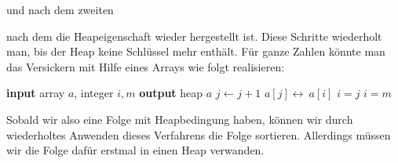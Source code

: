 \documentclass[tikz,12pt]{article}
\begin{document}
und nach dem zweiten
\begin{center}
\end{center}
nach dem die Heapeigenschaft wieder hergestellt ist.
Diese Schritte wiederholt man, bis der Heap keine Schlüssel mehr enthält. 
Für ganze Zahlen könnte man das Versickern mit Hilfe eines Arrays wie folgt realisieren:
\begin{algorithmic}[1]
  \State \textbf{input} array $a$, integer $i,m$
  \State \textbf{output} heap $a$
  \State $j\leftarrow j+1$
  \EndIf
  \EndIf
  \State $a[j]\leftrightarrow\ a[i]$
  \State $i = j$
  \Else
  \State $i = m$
  \EndIf
  \EndWhile
  \EndProcedure
\end{algorithmic}
Sobald wir also eine Folge mit Heapbedingung haben, können wir durch wiederholtes Anwenden dieses Verfahrens die Folge sortieren.
Allerdings müssen wir die Folge dafür erstmal in einen Heap verwanden. 
\end{document}
